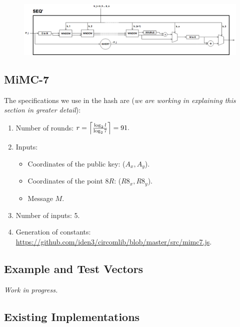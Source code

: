 \documentclass{article}
\begin{document}
\begin{spacing}{1.2}
\begin{enumerate}
			\begin{figure}[h]
				\centering
				\includegraphics[scale=0.43]{../../figures/multiplication-SEQ-prime.png}
			\end{figure}
			
		\end{enumerate}
		

	\subsection{MiMC-7} \label{sec-mimc}
		
	The specifications we use in the hash are ({\it we are working in explaining this section in greater detail}):
		
	\begin{enumerate}
		\item Number of rounds: $ r = \ceil*{\frac{\llog l}{\llog 7}} = 91. $
		
		\item Inputs: 
				\begin{itemize}
					\item Coordinates of the public key: ($A_x, A_y$).
					\item Coordinates of the point $8R$: ($R8_x, R8_y$).
					\item Message $M$. 
				\end{itemize}
		\item Number of inputs: 5.
		
		\item Generation of constants:  \url{https://github.com/iden3/circomlib/blob/master/src/mimc7.js}.
	\end{enumerate}
		
	\subsection{Example and Test Vectors}
	
	{\it Work in progress.}
	
	\subsection{Existing Implementations}
	

\end{spacing}
\end{document}
